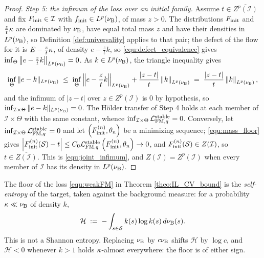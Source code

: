 \begin{proof}
\emph{Step 5: the infimum of the loss over an initial family.} Assume $t\in\overline{Z^p(\mathcal I)}$ and fix $F_{\mathrm{init}}\in\mathcal I$ with $f_{\mathrm{init}}\in L^p(\nu_{\mathrm{B}})$, of mass $z>0$. The distributions $F_{\mathrm{init}}$ and $\frac zt\kappa$ are dominated by $\nu_{\mathrm{B}}$, have equal total mass $z$ and have their densities in $L^p(\nu_{\mathrm{B}})$, so Definition \ref{def:universality} applies to that pair; the defect of the flow for it is $E-\frac zt\kappa$, of density $e-\frac ztk$, so \eqref{equ:defect_equivalence} gives $\inf_\Theta\left\|e-\frac ztk\right\|_{L^p(\nu_{\mathrm{B}})} = 0$. As $k\in L^p(\nu_{\mathrm{B}})$, the triangle inequality gives
\begin{equation}
    \inf_\Theta\|e-k\|_{L^p(\nu_{\mathrm{B}})}\;\leq\;\inf_\Theta\left\|e-\frac ztk\right\|_{L^p(\nu_{\mathrm{B}})}+\frac{|z-t|}{t}\left\|k\right\|_{L^p(\nu_{\mathrm{B}})}\;=\;\frac{|z-t|}{t}\left\|k\right\|_{L^p(\nu_{\mathrm{B}})} ,
\end{equation}
and the infimum of $|z-t|$ over $z\in Z^p(\mathcal I)$ is $0$ by hypothesis, so $\inf_{\mathcal I\times\Theta}\|e-k\|_{L^p(\nu_{\mathrm{B}})} = 0$. The H\"older transfer of Step 4 holds at each member of $\mathcal I\times\Theta$ with the same constant, whence $\inf_{\mathcal I\times\Theta}\mathcal L_{\mathrm{FM},q}^{\mathrm{stable}} = 0$. Conversely, let $\inf_{\mathcal I\times\Theta}\mathcal L_{\mathrm{FM},q}^{\mathrm{stable}} = 0$ and let $\left(F_{\mathrm{init}}^{(n)},\theta_n\right)$ be a minimizing sequence; \eqref{equ:mass_floor} gives $\left|F_{\mathrm{init}}^{(n)}(\mathcal S)-t\right|\leq C_0\mathcal L_{\mathrm{FM},q}^{\mathrm{stable}}\left(F_{\mathrm{init}}^{(n)},\theta_n\right)\rightarrow0$, and $F_{\mathrm{init}}^{(n)}(\mathcal S)\in Z(\mathcal I)$, so $t\in\overline{Z(\mathcal I)}$. This is \eqref{equ:joint_infimum}, and $Z(\mathcal I)=Z^p(\mathcal I)$ when every member of $\mathcal I$ has its density in $L^p(\nu_{\mathrm{B}})$.
\end{proof}


The floor of the loss \eqref{equ:weakFM} in Theorem \ref{theo:IL_CV_bound} is the \emph{self-entropy} of
the target, taken against the background measure: for a probability $\kappa\ll\nu_{\mathrm{B}}$ of
density $k$,
\begin{equation}
    \mathcal H \;:=\; -\int_{s\in\mathcal S}k(s)\log k(s)\,d\nu_{\mathrm{B}}(s) .
\end{equation}
This is not a Shannon entropy. Replacing $\nu_{\mathrm{B}}$ by $c\nu_{\mathrm{B}}$ shifts $\mathcal H$ by $\log c$,
and $\mathcal H<0$ whenever $k>1$ holds $\kappa$-almost everywhere: the floor is of either
sign.

